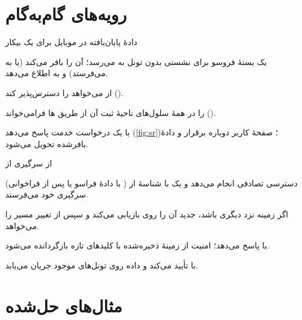 \documentclass[11pt,a4paper]{article}
\begin{document}
\section{رویه‌های گام‌به‌گام}

\begin{procedurebox}{دادهٔ پایان‌یافته در موبایل برای یک  بیکار}\label{proc:mt}
\begin{steps}
  \item یک بستهٔ فروسو برای نشستی بدون تونل  به  می‌رسد؛  آن را بافر می‌کند (یا به  می‌فرستد) و به  اطلاع می‌دهد.
  \item {} از  می‌خواهد  را دسترس‌پذیر کند ().
  \item {}  را در همهٔ سلول‌های ناحیهٔ ثبت آن از طریق ها فرامی‌خواند ().
  \item {} با یک درخواست خدمت پاسخ می‌دهد (\cref{fig:sr})؛ صفحهٔ کاربر دوباره برقرار و دادهٔ بافرشده تحویل می‌شود.
\end{steps}
\end{procedurebox}

\begin{procedurebox}{از سرگیری از }\label{proc:resume}
\begin{steps}
  \item {} (با دادهٔ فراسو یا پس از فراخوانی ) دسترسی تصادفی انجام می‌دهد و یک  با شناسهٔ از سرگیری خود می‌فرستد.
  \item اگر زمینه نزد  دیگری باشد،  جدید آن را روی  بازیابی می‌کند و سپس از  تغییر مسیر  را می‌خواهد.
  \item {} با  پاسخ می‌دهد؛ امنیت از زمینهٔ ذخیره‌شده با کلیدهای تازه بازگردانده می‌شود.
  \item {} با  تأیید می‌کند و داده روی تونل‌های  موجود جریان می‌یابد.
\end{steps}
\end{procedurebox}

\section{مثال‌های حل‌شده}
\end{document}
